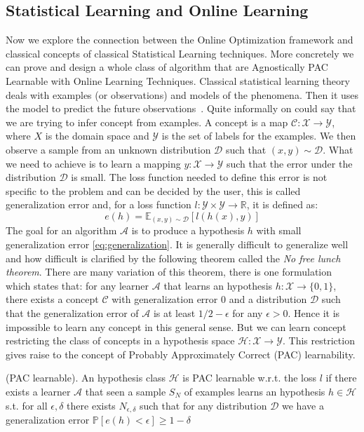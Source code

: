 \subsection{Statistical Learning and Online Learning}
Now we explore the connection between the Online Optimization framework and classical concepts of classical Statistical Learning techniques. More concretely we can prove and design a whole class of algorithm that are Agnostically PAC Learnable with Online Learning Techniques.
Classical statistical learning theory deals with examples (or observations) and models of the phenomena. Then it uses the model to predict the future observations~\cite{bousquet2003introduction}. Quite informally on could say that we are trying to infer concept from examples. A concept is a map $\mathcal C:\mathcal X\to\mathcal Y$, where $X$ is the domain space and $\mathcal Y$ is the set of labels for the examples. We then observe a sample from an unknown distribution $\mathcal D$ such that $(x,y)\sim \mathcal D$. What we need to achieve is to learn a mapping $y:\mathcal X\to\mathcal Y$ such that the error under the distribution $\mathcal D$ is small. The loss function needed to define this error is not specific to the problem and can be decided by the user, this is called generalization error and, for a loss function $l:\mathcal Y\times\mathcal Y \to\mathbb R$, it is defined as:
\begin{equation}\label{eq:generalization}
    e(h) = \mathbb E_{(x,y)\sim \mathcal D}[l(h(x),y)]
\end{equation}
The goal for an algorithm $\mathcal A$ is to produce a hypothesis $h$ with small generalization error \eqref{eq:generalization}.
It is generally difficult to generalize well and how difficult is clarified by the following theorem called the \emph{No free lunch theorem}. There are many variation of this theorem, there is one formulation which states that: for any learner $\mathcal A$ that learns an hypothesis $h:\mathcal X\to \{0,1\}$, there exists a concept $\mathcal C$ with generalization error $0$ and a distribution $\mathcal D$ such that the generalization error of $\mathcal A$ is at least $1/2-\epsilon$ for any $\epsilon>0$. Hence it is impossible to learn any concept in this general sense. But we can learn concept restricting the class of concepts in a hypothesis space $\mathcal H:\mathcal X\to\mathcal Y$.
This restriction gives raise to the concept of Probably Approximately Correct (PAC) learnability. 

\begin{definition}(PAC learnable).\label{def:PAC}
    An hypothesis class $\mathcal H$ is PAC learnable w.r.t. the loss $l$ if there exists a learner $\mathcal A$ that seen a sample $S_N$ of examples learns an hypothesis $h\in\mathcal H$ s.t. for all $\epsilon,\delta$ there exists $N_{\epsilon,\delta}$ such that for any distribution $\mathcal D$ we have a generalization error $\mathbb P[e(h)<\epsilon]\ge1-\delta$
\end{definition}

